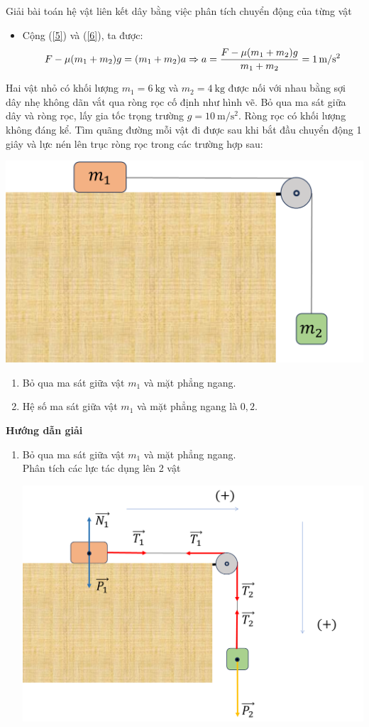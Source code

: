 \begin{dang}{Giải bài toán hệ vật liên kết dây bằng việc phân tích chuyển động của từng vật}
{\begin{itemize}
		\item Cộng (\ref{5}) và (\ref{6}), ta được:
		\begin{equation*}
			F - \mu (m_1 + m_2) g = (m_1 + m_2) a \\
			\Rightarrow a = \dfrac{F - \mu (m_1 + m_2)g}{m_1 + m_2} = \SI{1}{m/s^2}
		\end{equation*}
	\end{itemize}
}
{Hai vật nhỏ có khối lượng $m_1=\SI{6}{\kilogram}$ và $m_2=\SI{4}{\kilogram}$ được nối với nhau bằng sợi dây nhẹ không dãn vắt qua ròng rọc cố định như hình vẽ. Bỏ qua ma sát giữa dây và ròng rọc, lấy gia tốc trọng trường $g=\SI{10}{\meter/\second^2}$. Ròng rọc có khối lượng không đáng kể. Tìm quãng đường mỗi vật đi được sau khi bắt đầu chuyển động 1 giây và lực nén lên trục ròng rọc trong các trường hợp sau:
	\begin{center}
		\includegraphics[width=0.4\linewidth]{../figs/VN10-2023-PH-TP021-1}
	\end{center}
	\begin{enumerate}[label=\alph*)]
		\item Bỏ qua ma sát giữa vật $m_1$ và mặt phẳng ngang.
		\item Hệ số ma sát giữa vật $m_1$ và mặt phẳng ngang là $0,2$.
	\end{enumerate}
}
{\begin{center}
		\textbf{Hướng dẫn giải}
	\end{center}
\begin{enumerate}[label=\alph*)]
	\item Bỏ qua ma sát giữa vật $m_1$ và mặt phẳng ngang.\\
	Phân tích các lực tác dụng lên 2 vật
	\begin{center}
		\includegraphics[width=0.6\linewidth]{../figs/VN10-2023-PH-TP021-2}

\end{center}
\end{enumerate}}
\end{dang}
